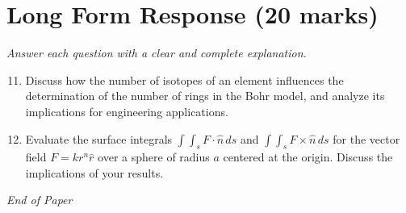 \documentclass[12pt]{article}
\begin{document}
\section*{Long Form Response (20 marks)}
\textit{Answer each question with a clear and complete explanation.}
\begin{enumerate}[label=\arabic*.]
\setcounter{enumi}{10}
\item Discuss how the number of isotopes of an element influences the determination of the
number of rings in the Bohr model, and analyze its implications for engineering
applications.
\item Evaluate the surface integrals \(\int\int_s F \cdot \hat{n} \, ds\) and \(\int\int_s F
\times \hat{n} \, ds\) for the vector field \(F = kr^n \hat{r}\) over a sphere of radius
\(a\) centered at the origin. Discuss the implications of your results.
\end{enumerate}

\vfill
\noindent\textit{End of Paper}
\end{document}

